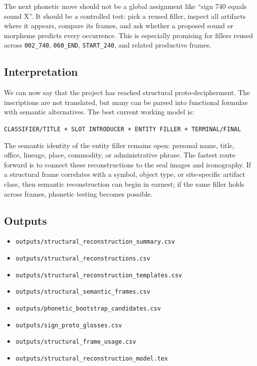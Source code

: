 The next phonetic move should not be a global assignment like ``sign 740 equals sound X''. It should be a controlled test: pick a reused filler, inspect all artifacts where it appears, compare its frames, and ask whether a proposed sound or morpheme predicts every occurrence. This is especially promising for fillers reused across \texttt{002\_740}, \texttt{060\_END}, \texttt{START\_240}, and related productive frames.

\subsection{Interpretation}

We can now say that the project has reached structural proto-decipherment. The inscriptions are not translated, but many can be parsed into functional formulae with semantic alternatives. The best current working model is:

\begin{center}
\texttt{CLASSIFIER/TITLE + SLOT INTRODUCER + ENTITY FILLER + TERMINAL/FINAL}
\end{center}

The semantic identity of the entity filler remains open: personal name, title, office, lineage, place, commodity, or administrative phrase. The fastest route forward is to connect these reconstructions to the seal images and iconography. If a structural frame correlates with a symbol, object type, or site-specific artifact class, then semantic reconstruction can begin in earnest; if the same filler holds across frames, phonetic testing becomes possible.

\subsection{Outputs}

\begin{itemize}
  \item \texttt{outputs/structural\_reconstruction\_summary.csv}
  \item \texttt{outputs/structural\_reconstructions.csv}
  \item \texttt{outputs/structural\_reconstruction\_templates.csv}
  \item \texttt{outputs/structural\_semantic\_frames.csv}
  \item \texttt{outputs/phonetic\_bootstrap\_candidates.csv}
  \item \texttt{outputs/sign\_proto\_glosses.csv}
  \item \texttt{outputs/structural\_frame\_usage.csv}
  \item \texttt{outputs/structural\_reconstruction\_model.tex}
\end{itemize}
